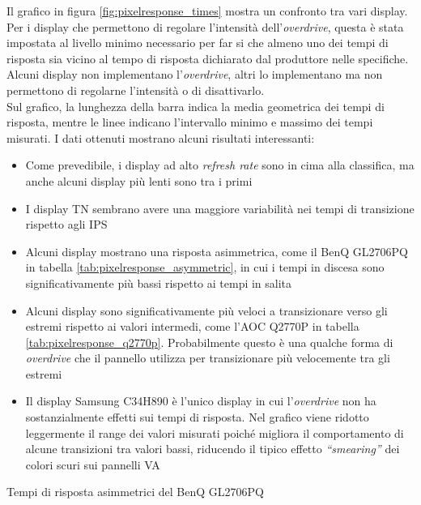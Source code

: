 Il grafico in figura \ref{fig:pixelresponse_times} mostra un confronto tra vari display. Per i display che permettono di regolare l'intensità dell'\textit{overdrive}, questa è stata impostata al livello minimo necessario per far si che almeno uno dei tempi di risposta sia vicino al tempo di risposta dichiarato dal produttore nelle specifiche. Alcuni display non implementano l'\textit{overdrive}, altri lo implementano ma non permettono di regolarne l'intensità o di disattivarlo.\\
Sul grafico, la lunghezza della barra indica la media geometrica dei tempi di risposta, mentre le linee indicano l'intervallo minimo e massimo dei tempi misurati. I dati ottenuti mostrano alcuni risultati interessanti:\begin{itemize}
	\item Come prevedibile, i display ad alto \textit{refresh rate} sono in cima alla classifica, ma anche alcuni display più lenti sono tra i primi
	\item I display TN sembrano avere una maggiore variabilità nei tempi di transizione rispetto agli IPS
	\item Alcuni display mostrano una risposta asimmetrica, come il BenQ GL2706PQ in tabella \ref{tab:pixelresponse_asymmetric}, in cui i tempi in discesa sono significativamente più bassi rispetto ai tempi in salita
	\item Alcuni display sono significativamente più veloci a transizionare verso gli estremi rispetto ai valori intermedi, come l'AOC Q2770P in tabella \ref{tab:pixelresponse_q2770p}. Probabilmente questo è una qualche forma di \textit{overdrive} che il pannello utilizza per transizionare più velocemente tra gli estremi
	\item Il display Samsung C34H890 è l'unico display in cui l'\textit{overdrive} non ha sostanzialmente effetti sui tempi di risposta. Nel grafico viene ridotto leggermente il range dei valori misurati poiché migliora il comportamento di alcune transizioni tra valori bassi, riducendo il tipico effetto \textit{``smearing''} dei colori scuri sui pannelli VA
\end{itemize}

\begin{table}[h!]
	\centering
	\caption{\label{tab:pixelresponse_asymmetric}Tempi di risposta asimmetrici del BenQ GL2706PQ}
\end{table}

